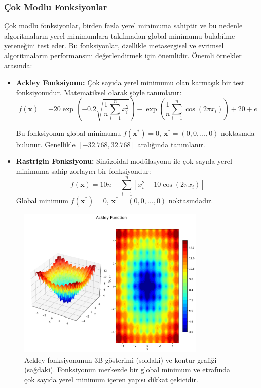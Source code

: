 \subsubsection{Çok Modlu Fonksiyonlar}

Çok modlu fonksiyonlar, birden fazla yerel minimuma sahiptir ve bu nedenle algoritmaların yerel minimumlara takılmadan global minimumu bulabilme yeteneğini test eder. Bu fonksiyonlar, özellikle metasezgisel ve evrimsel algoritmaların performansını değerlendirmek için önemlidir. Önemli örnekler arasında:

\begin{itemize}
    \item \textbf{Ackley Fonksiyonu:} Çok sayıda yerel minimumu olan karmaşık bir test fonksiyonudur. Matematiksel olarak şöyle tanımlanır:
    \begin{equation}
        f(\mathbf{x}) = -20\exp\left(-0.2\sqrt{\frac{1}{n}\sum_{i=1}^{n}x_i^2}\right) - \exp\left(\frac{1}{n}\sum_{i=1}^{n}\cos(2\pi x_i)\right) + 20 + e
    \end{equation}
    
    Bu fonksiyonun global minimumu $f(\mathbf{x}^*) = 0$, $\mathbf{x}^* = (0, 0, \ldots, 0)$ noktasında bulunur. Genellikle $[-32.768, 32.768]$ aralığında tanımlanır.
    
    \item \textbf{Rastrigin Fonksiyonu:} Sinüzoidal modülasyonu ile çok sayıda yerel minimuma sahip zorlayıcı bir fonksiyondur:
    \begin{equation}
        f(\mathbf{x}) = 10n + \sum_{i=1}^{n} \left[ x_i^2 - 10\cos(2\pi x_i) \right]
    \end{equation}
    Global minimum $f(\mathbf{x}^*) = 0$, $\mathbf{x}^* = (0, 0, \ldots, 0)$ noktasındadır.
\end{itemize}

\begin{figure}[h]
    \centering
    \includegraphics[width=0.8\textwidth]{weeks_new/imgs/ackley_function.png}
    \caption{Ackley fonksiyonunun 3B gösterimi (soldaki) ve kontur grafiği (sağdaki). Fonksiyonun merkezde bir global minimum ve etrafında çok sayıda yerel minimum içeren yapısı dikkat çekicidir.}
    \label{fig:ackley}
\end{figure}

